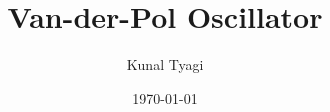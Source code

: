 \documentclass[12pt, a4paper]{article}
\title{Van-der-Pol Oscillator}
\author{Kunal Tyagi}
\date{\today}
\begin{document}
\maketitle
\cite{wiki, slides}




{}
\end{document}
